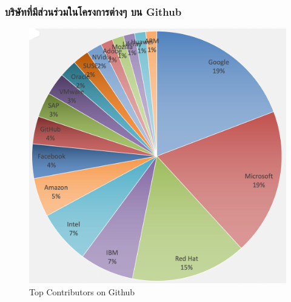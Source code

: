 \begin{frame}[t]
  \frametitle{บริษัทที่มีส่วนร่วมในโครงการต่างๆ บน Github}

  \begin{center}
    \begin{figure}[h!]
      \includegraphics[height=.6\paperheight]{images/github-top.png}
      \caption*{Top Contributors on Github \footnotemark[12]}
    \end{figure}
  \end{center}
\end{frame}